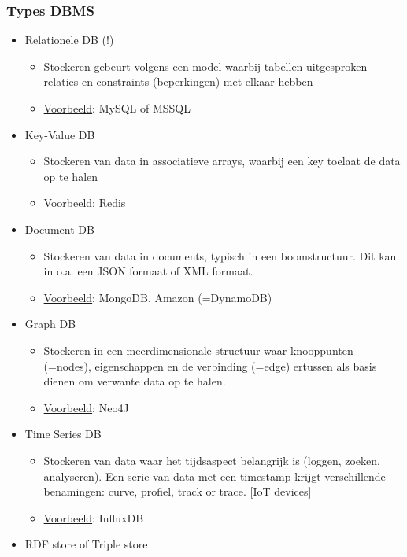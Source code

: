 \documentclass{article}
\begin{document}
\subsubsection{Types DBMS}
\begin{itemize}
    \item Relationele DB (!)
    \begin{itemize}
        \item Stockeren gebeurt volgens een model waarbij tabellen uitgesproken relaties en constraints (beperkingen) met elkaar hebben
        \item \underline{Voorbeeld}: MySQL of MSSQL
    \end{itemize}
    \item Key-Value DB
    \begin{itemize}
        \item Stockeren van data in associatieve arrays, waarbij een key toelaat de data op te halen
        \item \underline{Voorbeeld}: Redis
    \end{itemize}
    \item Document DB
    \begin{itemize}
        \item Stockeren van data in documents, typisch in een boomstructuur. Dit kan in o.a. een JSON formaat of XML formaat.
        \item \underline{Voorbeeld}: MongoDB, Amazon (=DynamoDB)
    \end{itemize}
    \item Graph DB
    \begin{itemize}
        \item Stockeren in een meerdimensionale structuur waar knooppunten (=nodes), eigenschappen en de verbinding (=edge) ertussen als basis dienen om verwante data op te halen.
        \item \underline{Voorbeeld}: Neo4J
    \end{itemize}
    \item Time Series DB
    \begin{itemize}
        \item Stockeren van data waar het tijdsaspect belangrijk is (loggen, zoeken, analyseren). Een serie van data met een timestamp krijgt verschillende benamingen: curve, profiel, track or trace. [IoT devices]
        \item \underline{Voorbeeld}: InfluxDB
    \end{itemize}
    \item RDF store of Triple store

\end{itemize}
\end{document}
